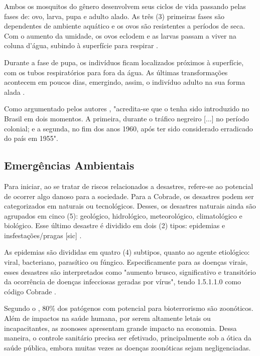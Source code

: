 \indent Ambos os mosquitos do gênero  desenvolvem seus ciclos de vida passando pelas fases de: ovo, larva, pupa e adulto alado. As três (3) primeiras fases são dependentes de ambiente aquático e os ovos são resistentes a períodos de seca. Com o aumento da umidade, os ovos eclodem e as larvas passam a viver na coluna d'água, subindo à superfície para respirar \cite{OTPCampo}.

\indent Durante a fase de pupa, os indivíduos ficam localizados próximos à superfície, com os tubos respiratórios para fora da água. As últimas transformações acontecem em poucos dias, emergindo, assim, o indivíduo adulto na sua forma alada \cite{OTPCampo}.

\indent Como argumentado pelos autores , "acredita-se que o  tenha sido introduzido no Brasil em dois momentos. A primeira, durante o tráfico negreiro [...] no período colonial; e a segunda, no fim dos anos 1960, após ter sido considerado erradicado do país em 1955".

\subsection{Emergências Ambientais}

\indent Para iniciar, ao se tratar de riscos relacionados a desastres, refere-se ao
potencial de ocorrer algo danoso para a sociedade. Para a \acrfull{Cobrade}, os desastres podem ser categorizados em naturais ou tecnológicos. Desses, os desastres naturais ainda são agrupados em cinco (5): geológico, hidrológico, meteorológico, climatológico e biológico. Esse último desastre é dividido em dois (2) tipos: epidemias e insfestações/pragas [sic]  \cite{GIRD}.

\indent As epidemias são divididas em quatro (4) subtipos,  quanto ao agente etiológico: viral, bacteriano, parasítico ou fúngico. Especificamente para as doenças virais, esses desastres são interpretados como "aumento brusco, significativo e transitório da ocorrência de doenças infecciosas geradas por vírus", tendo 1.5.1.1.0 como código \acrshort{Cobrade} \cite{GIRD}.

\indent Segundo o , 80\% dos patógenos com potencial para bioterrorismo são zoonóticos. Além de impactos na saúde humana, por serem altamente letais ou incapacitantes, as zoonoses apresentam grande impacto na economia. Dessa maneira, o controle sanitário precisa ser efetivado, principalmente sob a ótica da saúde pública, embora muitas vezes as doenças zoonóticas sejam negligenciadas.

